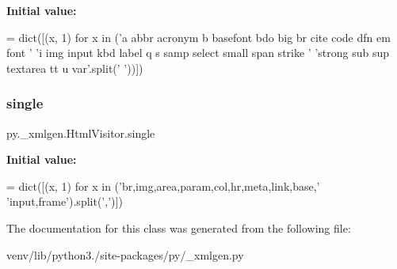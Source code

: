 {\bfseries Initial value\+:}
\begin{DoxyCode}
=  dict([(x, 1) \textcolor{keywordflow}{for} x \textcolor{keywordflow}{in}
                (\textcolor{stringliteral}{'a abbr acronym b basefont bdo big br cite code dfn em font '}
                 \textcolor{stringliteral}{'i img input kbd label q s samp select small span strike '}
                 \textcolor{stringliteral}{'strong sub sup textarea tt u var'}.split(\textcolor{stringliteral}{' '}))])
\end{DoxyCode}
\mbox{\label{classpy_1_1__xmlgen_1_1_html_visitor_af3c0a29c903cb7e876a5709db34fa084}} 
\subsubsection{\texorpdfstring{single}{single}}
{\footnotesize\ttfamily py.\+\_\+xmlgen.\+Html\+Visitor.\+single\hspace{0.3cm}{\ttfamily [static]}}

{\bfseries Initial value\+:}
\begin{DoxyCode}
=  dict([(x, 1) \textcolor{keywordflow}{for} x \textcolor{keywordflow}{in}
                (\textcolor{stringliteral}{'br,img,area,param,col,hr,meta,link,base,'}
                    \textcolor{stringliteral}{'input,frame'}).split(\textcolor{stringliteral}{','})])
\end{DoxyCode}


The documentation for this class was generated from the following file\+:\begin{DoxyCompactItemize}
\item 
venv/lib/python3./site-\/packages/py/\+\_\+xmlgen.\+py\end{DoxyCompactItemize}
